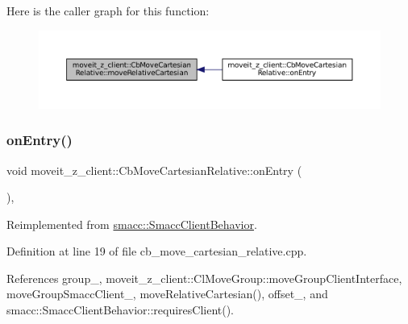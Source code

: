 Here is the caller graph for this function\+:
\nopagebreak
\begin{figure}[H]
\begin{center}
\leavevmode
\includegraphics[width=350pt]{classmoveit__z__client_1_1CbMoveCartesianRelative_aa8535a52826c36b103abebba6da7737f_icgraph}
\end{center}
\end{figure}
\mbox{\label{classmoveit__z__client_1_1CbMoveCartesianRelative_aaea0e6c7431f93301a77269b8fa539f8}} 
\subsubsection{\texorpdfstring{on\+Entry()}{onEntry()}}
{\footnotesize\ttfamily void moveit\+\_\+z\+\_\+client\+::\+Cb\+Move\+Cartesian\+Relative\+::on\+Entry (\begin{DoxyParamCaption}{ }\end{DoxyParamCaption})\hspace{0.3cm}{\ttfamily [override]}, {\ttfamily [virtual]}}



Reimplemented from \hyperlink{classsmacc_1_1SmaccClientBehavior_a7962382f93987c720ad432fef55b123f}{smacc\+::\+Smacc\+Client\+Behavior}.



Definition at line 19 of file cb\+\_\+move\+\_\+cartesian\+\_\+relative.\+cpp.



References group\+\_\+, moveit\+\_\+z\+\_\+client\+::\+Cl\+Move\+Group\+::move\+Group\+Client\+Interface, move\+Group\+Smacc\+Client\+\_\+, move\+Relative\+Cartesian(), offset\+\_\+, and smacc\+::\+Smacc\+Client\+Behavior\+::requires\+Client().


